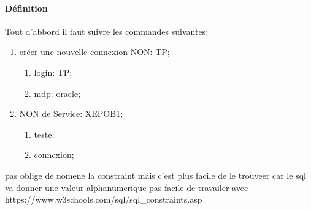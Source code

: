 \documentclass{article}
\begin{document}
\paragraph{Définition}Tout d'abbord il faut suivre les commandes suivantes:
\begin{enumerate}
    \item créer une nouvelle connexion NON: TP;
    \begin{enumerate}[noitemsep]
        \item login: TP;
        \item mdp: oracle;
    \end{enumerate}
    \item NON de Service: XEPOB1;
    \begin{enumerate}
        \item teste;
        \item connexion;
    \end{enumerate}
\end{enumerate}
pas oblige de nomene la constraint mais c'est plus facile de le trouveer car le sql va donner une valeur alphanumerique pas facile de travailer avec
https://www.w3schools.com/sql/sql_constraints.asp
\end{document}

